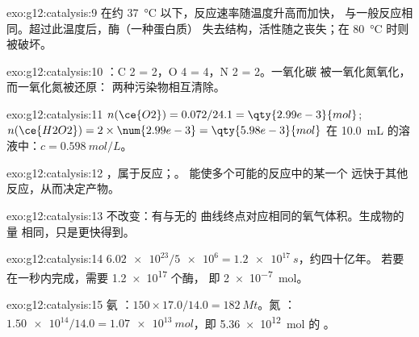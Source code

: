 \begin{solution}{exo:g12:catalysis:9}
在约 \qty{37}{\celsius} 以下，反应速率随温度升高而加快，
与一般反应相同。超过此温度后，酶（一种蛋白质）
失去结构，活性随之丧失；在 \qty{80}{\celsius} 时则被破坏。
\end{solution}

\begin{solution}{exo:g12:catalysis:10}
：C 2 = 2，O 4 = 4，N 2 = 2。一氧化碳
被一氧化氮氧化，而一氧化氮被还原：
两种污染物相互清除。
\end{solution}

\begin{solution}{exo:g12:catalysis:11}
$n(\ce{O2}) = 0.072 / 24.1 = \qty{2.99e-3}{mol}$;
$n(\ce{H2O2}) = 2 \times \num{2.99e-3} = \qty{5.98e-3}{mol}$ 在
\qty{10.0}{mL} 的溶液中：$c = \qty{0.598}{mol/L}$。
\end{solution}

\begin{solution}{exo:g12:catalysis:12}
，属于反应；。
能使多个可能的反应中的某一个
远快于其他反应，从而决定产物。
\end{solution}

\begin{solution}{exo:g12:catalysis:13}
不改变：有与无的
曲线终点对应相同的氧气体积。生成物的量
相同，只是更快得到。
\end{solution}

\begin{solution}{exo:g12:catalysis:14}
$\num{6.02e23} / \num{5e6} = \qty{1.2e17}{s}$，约四十亿年。
若要在一秒内完成，需要 \num{1.2e17} 个酶，
即 \qty{2e-7}{mol}。
\end{solution}

\begin{solution}{exo:g12:catalysis:15}
氨 ：$150 \times 17.0 / 14.0 = \qty{182}{Mt}$。氮
：$\num{1.50e14} / 14.0 = \qty{1.07e13}{mol}$，即
\qty{5.36e12}{mol} 的 。
\end{solution}

